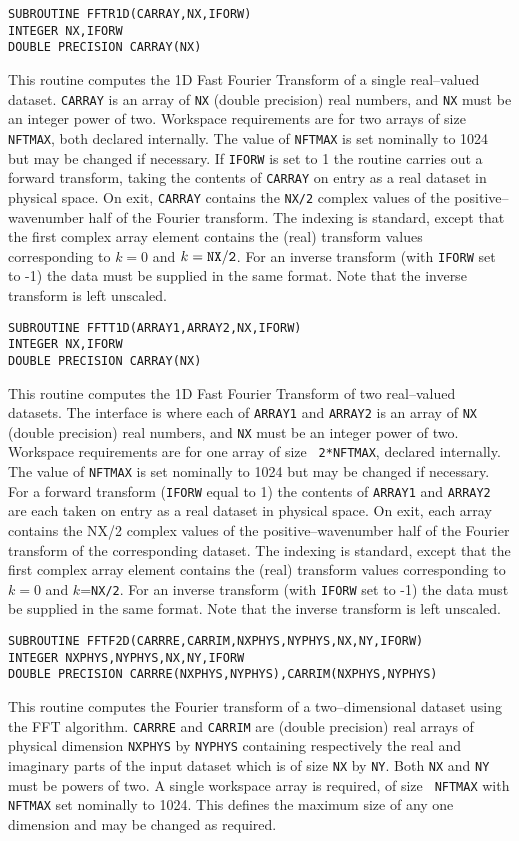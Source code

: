 \documentclass[dvips]{article}
\begin{document}
\begin{verbatim}
SUBROUTINE FFTR1D(CARRAY,NX,IFORW)
INTEGER NX,IFORW
DOUBLE PRECISION CARRAY(NX)
\end{verbatim}
This routine computes the 1D Fast Fourier Transform of a single real--valued
dataset.  
{\tt CARRAY} is an array of {\tt NX} (double precision) real numbers,
and {\tt NX} must be an
integer power of two.  Workspace requirements are for two arrays of size {\tt
NFTMAX}, both declared internally.  The value of {\tt NFTMAX} is set nominally
to 1024 but may be changed if necessary.  If {\tt IFORW} is set to 1 the
routine carries out a forward transform, taking the contents of {\tt CARRAY}
on entry as a real dataset in physical space.  On exit, {\tt CARRAY} contains
the {\tt NX/2} complex values
of the positive--wavenumber half of the Fourier transform.  The indexing is
standard, except that the first complex array element contains the (real)
transform values corresponding to $k=0$ and $k={\tt NX/2}$.  For an inverse
transform (with {\tt IFORW} set to -1) the data must be supplied in the same
format.  Note that the inverse transform is left unscaled.

\begin{verbatim}
SUBROUTINE FFTT1D(ARRAY1,ARRAY2,NX,IFORW)
INTEGER NX,IFORW
DOUBLE PRECISION CARRAY(NX)
\end{verbatim}
This routine computes the 1D Fast Fourier Transform of two real--valued
datasets.  The interface is where each of {\tt ARRAY1} and {\tt ARRAY2} is
an array of {\tt NX} (double precision) real numbers, and {\tt NX} must be an
integer power of two.  Workspace requirements are for one array of size {\tt
2*NFTMAX}, declared internally.  The value of {\tt NFTMAX} is set nominally to
1024 but may be changed if necessary.  For a forward transform ({\tt IFORW}
equal to 1) the contents of {\tt ARRAY1} and {\tt ARRAY2} are each taken on
entry as a real dataset in physical space.  On exit, each array contains the
NX/2 complex values of the positive--wavenumber half of the Fourier transform
of the corresponding dataset.  The indexing is
standard, except that the first complex array element contains the (real)
transform values corresponding to $k=0$ and $k$={\tt NX/2}.  For an inverse
transform (with {\tt IFORW} set to -1) the data must be supplied in the same
format.  Note that the inverse transform is left unscaled.

\begin{verbatim}
SUBROUTINE FFTF2D(CARRRE,CARRIM,NXPHYS,NYPHYS,NX,NY,IFORW)
INTEGER NXPHYS,NYPHYS,NX,NY,IFORW
DOUBLE PRECISION CARRRE(NXPHYS,NYPHYS),CARRIM(NXPHYS,NYPHYS)
\end{verbatim}
This routine computes the Fourier transform of a two--dimensional dataset
using the FFT algorithm.
{\tt CARRRE} and {\tt CARRIM} are (double precision) real arrays
of physical dimension {\tt NXPHYS} by {\tt NYPHYS} containing respectively
the real and imaginary parts of the input dataset which is of size {\tt NX}
by {\tt NY}.  Both {\tt NX} and {\tt NY} must
be powers of two.   A single workspace array is required, of size {\tt
NFTMAX} with {\tt NFTMAX} set nominally to 1024.  This defines the
maximum size of any one dimension and may be changed as required.
\end{document}
